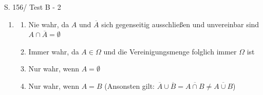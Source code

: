 \begin{Exercise}{S. 156/ Test B - 2}{}
\begin{enumerate}[leftmargin=*]
    \item [2.]\begin{enumerate}[label=\alph*),leftmargin=*]
        \item[a)] {
            Nie wahr, da $A$ und $\overline{A}$ sich gegenseitig ausschließen und unvereinbar sind $A \cap \overline{A} = \emptyset$
            }
        \item[b)] {
            Immer wahr, da $A \in \Omega$ und die Vereinigungsmenge folglich immer $\Omega$ ist
            }
        \item[c)] {
            Nur wahr, wenn $A = \emptyset$ 
            }
        \item[d)] {
            Nur wahr, wenn $A = B$ (Ansonsten gilt: $\overline{A} \cup \overline{B} = \overline{A \cap B} \neq \overline{A \cup B}$)           
            }
    \end{enumerate}
\end{enumerate}
\end{Exercise}